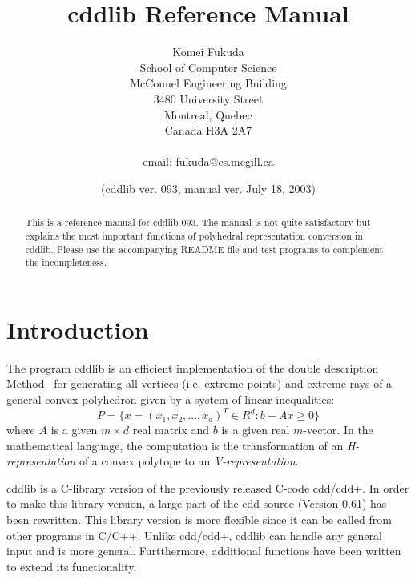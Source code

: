 \documentclass[11pt]{article}
\newcommand {\0} {{\bf 0}}
\begin{document}
\title{cddlib Reference Manual}
\author{Komei Fukuda\\
School of Computer Science\\
McConnel Engineering Building\\
3480 University Street\\
Montreal, Quebec\\
Canada H3A 2A7\\ \\
email: fukuda@cs.mcgill.ca\\
}
\date{ (cddlib ver. 093, manual ver. July 18, 2003)}

\maketitle
\begin{abstract}
This is a reference manual for cddlib-093.  
The manual is not quite satisfactory
but explains the most important functions of polyhedral
representation conversion in cddlib.  
Please use the accompanying README file and test programs to complement the incompleteness.
\end{abstract}

\section{Introduction} \label{INTRODUCTION}

The program  cddlib  is an efficient implementation \cite{fp-ddmr-96}  of 
the double description Method~\cite{mrtt-ddm-53}
for generating  all vertices (i.e. extreme points)
and extreme rays of a general 
convex polyhedron given by 
a system of linear inequalities:
\[
   P = \{ x=(x_1, x_2, \ldots, x_d)^T \in R^{d}:  b - A  x  \ge 0 \}
\]
where $A$ is a given $m \times d$ real matrix and 
$b$ is a given real $m$-vector.   In the mathematical
language, the computation is the transformation
of an {\em H-representation\/} of a convex polytope
to an {\em V-representation}.  

cddlib is a C-library version of the previously released C-code cdd/cdd+.
In order to make this library version, a large part of the cdd source
(Version 0.61) has been rewritten.
This library version is more flexible since it can be called from other programs in C/C++.
Unlike cdd/cdd+, cddlib can handle any general input and is more general.
Furtthermore,  additional functions have been written to extend its functionality.
\end{document}
